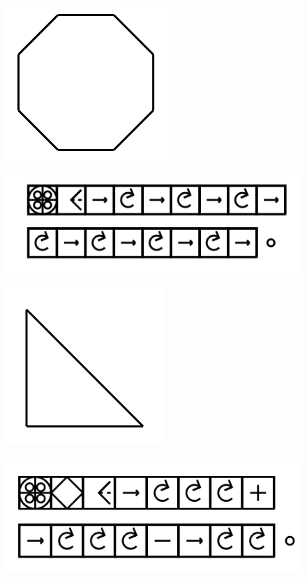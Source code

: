 \documentclass[11pt]{article}
\begin{document}
\begin{figure}
\includegraphics[scale=0.3]{image13.png}
\end{figure}
\begin{figure}
\includegraphics[scale=0.3]{image14.png}
\end{figure}

\begin{figure}
\includegraphics[scale=0.3]{image15.png}
\end{figure}
\begin{figure}
\includegraphics[scale=0.3]{image16.png}
\end{figure}
\end{document}
